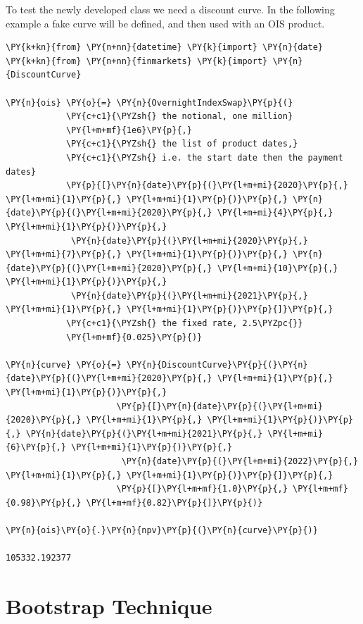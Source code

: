 To test the newly developed class we need a discount curve. In the
following example a fake curve will be defined, and then used with an
OIS product.

\begin{codebox}
\begin{Verbatim}[commandchars=\\\{\}]
\PY{k+kn}{from} \PY{n+nn}{datetime} \PY{k}{import} \PY{n}{date}
\PY{k+kn}{from} \PY{n+nn}{finmarkets} \PY{k}{import} \PY{n}{DiscountCurve}

\PY{n}{ois} \PY{o}{=} \PY{n}{OvernightIndexSwap}\PY{p}{(}
            \PY{c+c1}{\PYZsh{} the notional, one million}
            \PY{l+m+mf}{1e6}\PY{p}{,}
            \PY{c+c1}{\PYZsh{} the list of product dates,}
            \PY{c+c1}{\PYZsh{} i.e. the start date then the payment dates}
            \PY{p}{[}\PY{n}{date}\PY{p}{(}\PY{l+m+mi}{2020}\PY{p}{,} \PY{l+m+mi}{1}\PY{p}{,} \PY{l+m+mi}{1}\PY{p}{)}\PY{p}{,} \PY{n}{date}\PY{p}{(}\PY{l+m+mi}{2020}\PY{p}{,} \PY{l+m+mi}{4}\PY{p}{,} \PY{l+m+mi}{1}\PY{p}{)}\PY{p}{,}
             \PY{n}{date}\PY{p}{(}\PY{l+m+mi}{2020}\PY{p}{,} \PY{l+m+mi}{7}\PY{p}{,} \PY{l+m+mi}{1}\PY{p}{)}\PY{p}{,} \PY{n}{date}\PY{p}{(}\PY{l+m+mi}{2020}\PY{p}{,} \PY{l+m+mi}{10}\PY{p}{,} \PY{l+m+mi}{1}\PY{p}{)}\PY{p}{,}
             \PY{n}{date}\PY{p}{(}\PY{l+m+mi}{2021}\PY{p}{,} \PY{l+m+mi}{1}\PY{p}{,} \PY{l+m+mi}{1}\PY{p}{)}\PY{p}{]}\PY{p}{,}
            \PY{c+c1}{\PYZsh{} the fixed rate, 2.5\PYZpc{}}
            \PY{l+m+mf}{0.025}\PY{p}{)}

\PY{n}{curve} \PY{o}{=} \PY{n}{DiscountCurve}\PY{p}{(}\PY{n}{date}\PY{p}{(}\PY{l+m+mi}{2020}\PY{p}{,} \PY{l+m+mi}{1}\PY{p}{,} \PY{l+m+mi}{1}\PY{p}{)}\PY{p}{,}
                      \PY{p}{[}\PY{n}{date}\PY{p}{(}\PY{l+m+mi}{2020}\PY{p}{,} \PY{l+m+mi}{1}\PY{p}{,} \PY{l+m+mi}{1}\PY{p}{)}\PY{p}{,} \PY{n}{date}\PY{p}{(}\PY{l+m+mi}{2021}\PY{p}{,} \PY{l+m+mi}{6}\PY{p}{,} \PY{l+m+mi}{1}\PY{p}{)}\PY{p}{,}
                       \PY{n}{date}\PY{p}{(}\PY{l+m+mi}{2022}\PY{p}{,} \PY{l+m+mi}{1}\PY{p}{,} \PY{l+m+mi}{1}\PY{p}{)}\PY{p}{]}\PY{p}{,}
                      \PY{p}{[}\PY{l+m+mf}{1.0}\PY{p}{,} \PY{l+m+mf}{0.98}\PY{p}{,} \PY{l+m+mf}{0.82}\PY{p}{]}\PY{p}{)}

\PY{n}{ois}\PY{o}{.}\PY{n}{npv}\PY{p}{(}\PY{n}{curve}\PY{p}{)}

105332.192377
\end{Verbatim}
\end{codebox}

\section{Bootstrap Technique}\label{bootstrapping-technique}

